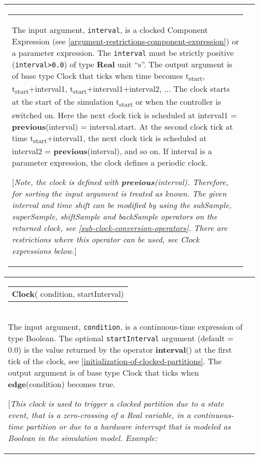 \begin{longtable}[]{|p{3cm}|p{12cm}|}
\begin{tabular}{@{}p{119mm}@{}}
The input argument, \lstinline!interval!, is a clocked Component Expression (see
\autoref{argument-restrictions-component-expression}) or a parameter expression.
The \lstinline!interval! must be strictly positive (\lstinline!interval>0.0!) of type \textbf{Real} unit ``s''. 
The output argument is of base type Clock that
ticks when time becomes t\textsubscript{start},
t\textsubscript{start}+interval1,
t\textsubscript{start}+interval1+interval2, ... The clock starts at the
start of the simulation t\textsubscript{start} or when the controller is
switched on. Here the next clock tick is scheduled at interval1 =
\textbf{previous}(interval) = interval.start. At the second clock tick
at time t\textsubscript{start}+interval1, the next clock tick is
scheduled at interval2 = \textbf{previous}(interval), and so on. If
interval is a parameter expression, the clock defines a periodic clock.

{[}\emph{Note, the clock is defined with \textbf{previous}(interval).
Therefore, for sorting the input argument is treated as known.}
\emph{The given interval and time shift can be modified by using the
subSample, superSample, shiftSample and backSample operators on the
returned clock, see \autoref{sub-clock-conversion-operators}. There are restrictions where
this operator can be used, see Clock expressions below.}{]}
\end{tabular}\\ \hline
\begin{tabular}{@{}p{29mm}@{}}
\textbf{Clock}(\newline
  condition,\newline
  startInterval)
\end{tabular}
&
\begin{tabular}{@{}p{119mm}@{}}
\textbf{Clock with Boolean Condition}\\

The input argument, \lstinline!condition!, is a continuous-time expression of type
Boolean. The optional \lstinline!startInterval! argument (default = 0.0) is the
value returned by the operator \textbf{interval}() at the first tick of
the clock, see \autoref{initialization-of-clocked-partitions}. The output argument is of base type Clock
that ticks when \textbf{edge}(condition) becomes true.

{[}\emph{This clock is used to trigger a clocked partition due to a
state event, that is a zero-crossing of a Real variable, in a
continuous-time partition or due to a hardware interrupt that is modeled
as Boolean in the simulation model. Example:}


\end{tabular}
\end{longtable}
